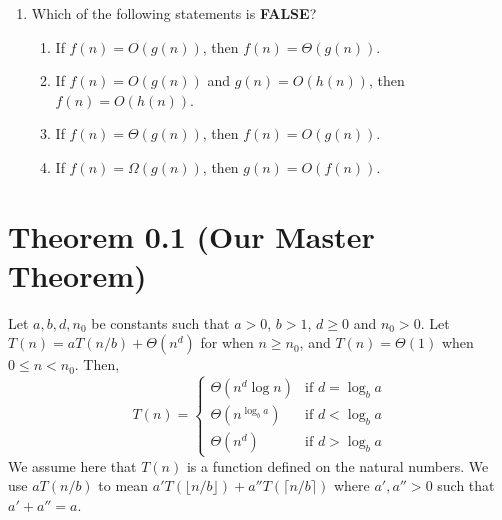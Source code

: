 \documentclass{article}
\begin{document}
\begin{enumerate}
    \item  Which of the following statements is \textbf{FALSE}?
    \begin{enumerate}
        \item If $f(n) = O(g(n))$, then $f(n) = \Theta(g(n))$.
        \item If $f(n) = O(g(n))$ and $g(n) = O(h(n))$, then $f(n) = O(h(n))$.
        \item If $f(n) = \Theta(g(n))$, then $f(n) = O(g(n))$.
        \item If $f(n) = \Omega(g(n))$, then $g(n) = O(f(n))$.
    \end{enumerate}

\end{enumerate}

\section*{Theorem 0.1 (Our Master Theorem)}
Let $a, b, d, n_0$ be constants such that $a > 0$, $b > 1$, $d \ge 0$ and $n_0 > 0$.
Let $T(n) = aT(n/b) + \Theta(n^d)$ for when $n \ge n_0$, and $T(n) = \Theta(1)$ when $0 \le n < n_0$. Then,
\[
T(n) = \begin{cases}
\Theta(n^d \log n) & \text{if } d = \log_b a \\
\Theta(n^{\log_b a}) & \text{if } d < \log_b a \\
\Theta(n^d) & \text{if } d > \log_b a
\end{cases}
\]
We assume here that $T(n)$ is a function defined on the natural numbers. We use $aT(n/b)$ to mean $a'T(\lfloor n/b \rfloor) + a''T(\lceil n/b \rceil)$ where $a', a'' > 0$ such that $a' + a'' = a$.
\end{document}
